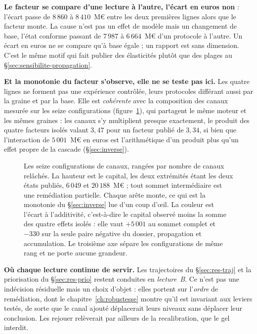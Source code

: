 \begin{attention}
\textbf{Le facteur se compare d'une lecture à l'autre, l'écart en euros non} : l'écart passe de $8\,860$ à $8\,410$~M\euro{}
entre les deux premières lignes alors que le facteur monte. La cause n'est pas un effet de modèle
mais un changement de base, l'état conforme passant de $7\,987$ à $6\,664$~M\euro{} d'un
protocole à l'autre. Un écart en euros ne se compare qu'à base égale ; un rapport est sans
dimension. C'est le même motif qui fait publier des élasticités plutôt que des plages au
\S\ref{sec:sensibilite-propagation}.

\textbf{Et la monotonie du facteur s'observe, elle ne se teste pas ici.} Les quatre lignes ne
forment pas une expérience contrôlée, leurs protocoles différant aussi par la graine et par la
base. Elle est \emph{cohérente} avec la composition des canaux mesurée sur les seize
configurations (figure~\ref{fig:treillis-canaux}), qui partagent le même moteur et les mêmes
graines : les canaux s'y multiplient
presque exactement, le produit des quatre facteurs isolés valant $3{,}47$ pour un facteur publié
de $3{,}34$, si bien que l'interaction de $5\,001$~M\euro{} en euros est l'arithmétique d'un
produit plus qu'un effet propre de la cascade (\S\ref{sec:inverse}).
\end{attention}

\begin{figure}[htbp]\centering
{}
\caption{Les seize configurations de canaux, rangées par nombre de canaux relâchés. La hauteur
est le capital, les deux extrémités étant les deux états publiés, $6\,049$ et $20\,188$~M\euro{} ;
tout sommet intermédiaire est une remédiation partielle. Chaque arête monte, ce qui est la
monotonie du \S\ref{sec:inverse} lue d'un coup d'\oe{}il. La couleur est l'écart à l'additivité,
c'est-à-dire le capital observé moins la somme des quatre effets isolés : elle vaut $+5\,001$ au
sommet complet et $-330$ sur la seule paire négative du dossier, propagation et accumulation. Le
troisième axe sépare les configurations de même rang et ne porte aucune grandeur.}
\label{fig:treillis-canaux}
\end{figure}

\noindent\textbf{Où chaque lecture continue de servir.} Les trajectoires du
\S\ref{sec:res-traj} et la priorisation du \S\ref{sec:res-prio} restent conduites en
\emph{lecture~B}. Ce n'est pas une indécision résiduelle mais un choix d'objet : elles portent
sur l'\emph{ordre} de remédiation, dont le chapitre~\ref{ch:robustesse} montre qu'il est
invariant aux leviers testés, de sorte que le canal ajouté déplacerait leurs niveaux sans
déplacer leur conclusion. Les rejouer relèverait par ailleurs de la recalibration, que le gel
interdit.

